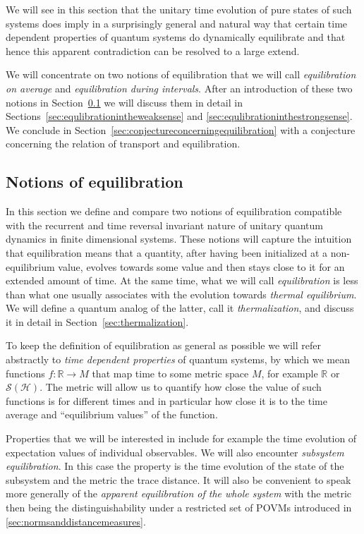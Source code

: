 \documentclass[a4paper,12pt,listof=totoc,index=totoc,bibliography=totoc,headsepline=false,headings=normal,BCOR16.153846mm,DIV12,headinclude,twoside,cleardoublepage=empty,numbers=noenddot,final]{scrreprt}
\theoremstyle{mystyle}
\numberwithin{equation}{section}
\numberwithin{figure}{section}
\numberwithin{lemma}{section}
\numberwithin{theorem}{section}
\numberwithin{corollary}{section}
\numberwithin{definition}{section}
\numberwithin{conjecture}{section}
\numberwithin{observation}{section}
\newcommand{\+}{\mkern2mu}
\newcommand{\oftype}{\colon}
\DeclareMathOperator{\1}{\mathds{1}}
\newcommand{\mc}[1]{\mathcal{#1}}
\newcommand{\mcH}{\mc{H}}
\newcommand{\mcS}{\mc{S}}
\newcommand{\mb}[1]{\mathbb{#1}}
\newcommand{\R}{\mb{R}}
\begin{document}
We will see in this section that the unitary time evolution of pure states of such systems does imply in a surprisingly general and natural way that certain time dependent properties of quantum systems do dynamically equilibrate and that hence this apparent contradiction can be resolved to a large extend.

We will concentrate on two notions of equilibration that we will call \emph{equilibration on average} and \emph{equilibration during intervals}.
After an introduction of these two notions in Section~\ref{sec:notionsofequilibration} we will discuss them in detail in Sections~\ref{sec:equlibrationintheweaksense} and \ref{sec:equlibrationinthestrongsense}.
We conclude in Section~\ref{sec:conjectureconcerningequilibration} with a conjecture concerning the relation of transport and equilibration.


\subsection{Notions of equilibration}
\label{sec:notionsofequilibration}
%
In this section we define and compare two notions of equilibration compatible with the recurrent and time reversal invariant nature of unitary quantum dynamics in finite dimensional systems.
These notions will capture the intuition that equilibration means that a quantity, after having been initialized at a non-equilibrium value, evolves towards some value and then stays close to it for an extended amount of time.
At the same time, what we will call \emph{equilibration} is less than what one usually associates with the evolution towards \emph{thermal equilibrium}.
We will define a quantum analog of the latter, call it \emph{thermalization}, and discuss it in detail in Section~\ref{sec:thermalization}.

To keep the definition of equilibration as general as possible we will refer abstractly to \emph{time dependent properties} of quantum systems, by which we mean functions $f\oftype \R\to M$ that map time to some metric space $M$, for example $\R$ or $\mcS(\mcH)$.
The metric will allow us to quantify how close the value of such functions is for different times and in particular how close it is to the time average and ``equilibrium values'' of the function.

Properties that we will be interested in include for example the time evolution of expectation values of individual observables.
We will also encounter \emph{subsystem equilibration}.
In this case the property is the time evolution of the state of the subsystem and the metric the trace distance.
It will also be convenient to speak more generally of the \emph{apparent equilibration of the whole system} with the metric then being the distinguishability under a restricted set of POVMs introduced in \ref{sec:normsanddistancemeasures}.
\end{document}
